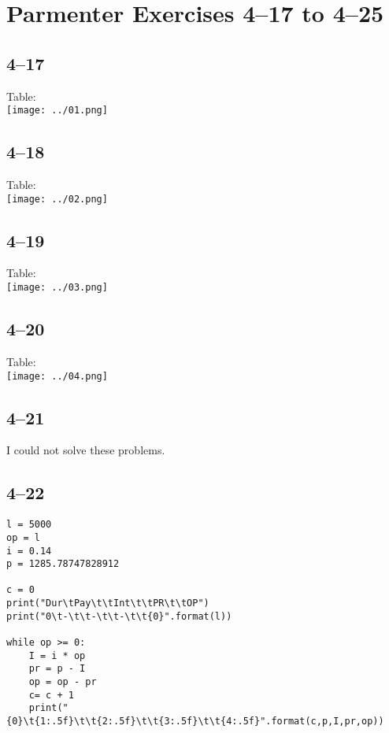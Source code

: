 \documentclass[a4paper, 12pt, reqno]{amsart}
\title{\titl}
\author{Moritz M. Konarski}
\date{\today}
\numberwithin{equation}{section}
\begin{document}
\maketitle

\section*{Parmenter Exercises 4--17 to 4--25}

\subsection*{4--17}

Table:\\
\texttt{[image: ../01.png]}


\subsection*{4--18}

Table:\\
\texttt{[image: ../02.png]}


\subsection*{4--19}

Table:\\
\texttt{[image: ../03.png]}


\subsection*{4--20}

Table:\\
\texttt{[image: ../04.png]}

\subsection*{4--21}

I could not solve these problems.

\subsection*{4--22}

\begin{verbatim}
l = 5000
op = l
i = 0.14
p = 1285.78747828912

c = 0
print("Dur\tPay\t\tInt\t\tPR\t\tOP")
print("0\t-\t\t-\t\t-\t\t{0}".format(l))

while op >= 0:
    I = i * op
    pr = p - I
    op = op - pr
    c= c + 1
    print("{0}\t{1:.5f}\t\t{2:.5f}\t\t{3:.5f}\t\t{4:.5f}".format(c,p,I,pr,op))
\end{verbatim}
\end{document}
